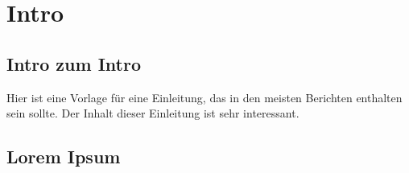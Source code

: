 \chapter{Intro}

\section{Intro zum Intro}

Hier ist eine Vorlage für eine Einleitung, das in den meisten Berichten enthalten sein sollte.
Der Inhalt dieser Einleitung ist sehr interessant.

\section{Lorem Ipsum}

\lipsum